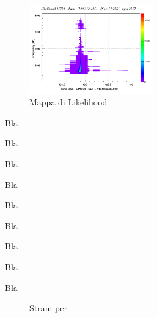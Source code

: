 \begin{figure}
	\vspace{-20pt}
	\begin{center}
		\includegraphics[width=0.475\textwidth]{figures/Capitolo_3/APR4_q09/l_tfmap_scalogram.png}
	\end{center}
	\vspace{-5pt}
	\caption{Mappa di Likelihood}
	\label{fig:Likelihood_APR4}
	\vspace{-10pt}
\end{figure}
Bla

Bla

Bla

Bla

Bla

Bla

Bla

Bla

Bla

\begin{figure}[H]
	\vspace{-20pt}
	\centering
	 \quad
	\vspace{-5pt}
	\caption{Strain per }
	\label{fig:strain_apr4}
	\vspace{-15pt}
\end{figure}

